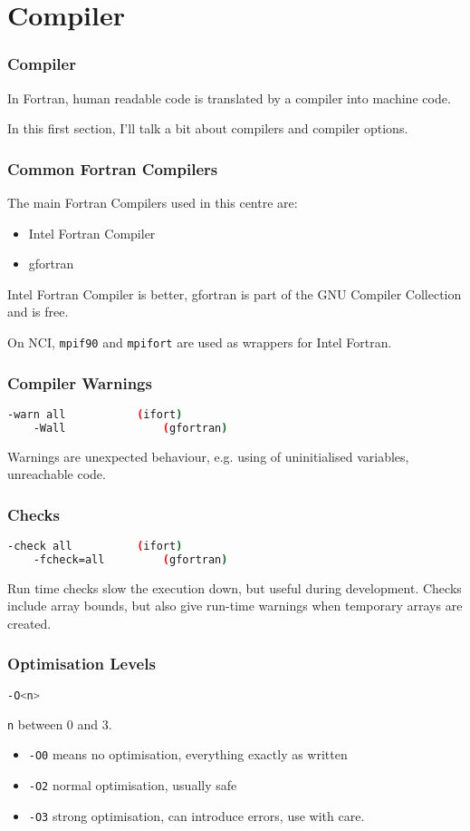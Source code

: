 \section{Compiler}
\begin{frame}
    \frametitle{Compiler}
    In Fortran, human readable code is translated
    by a compiler into machine code.

    In this first section, I'll talk a bit about compilers and compiler options.
\end{frame}

\begin{frame}
    \frametitle{Common Fortran Compilers}
    The main Fortran Compilers used in this centre are:
    \begin{itemize}
        \item Intel Fortran Compiler
        \item gfortran
    \end{itemize}
    Intel Fortran Compiler is better, gfortran is part of the GNU Compiler Collection and is free.

    On NCI, \texttt{mpif90} and \texttt{mpifort} are used as wrappers for Intel Fortran. 
\end{frame}
\begin{frame}[fragile]
    \frametitle{Compiler Warnings}
    \begin{lstlisting}[language=bash]
    -warn all           (ifort)
    -Wall               (gfortran)
    \end{lstlisting}
    Warnings are unexpected behaviour, e.g. using of uninitialised variables, unreachable code.
\end{frame}
\begin{frame}[fragile]
    \frametitle{Checks}
    \begin{lstlisting}[language=bash]
    -check all          (ifort)    
    -fcheck=all         (gfortran)
    \end{lstlisting}
    Run time checks slow the execution down, but useful during development.
    Checks include array bounds, but also give run-time warnings when temporary arrays are created.
\end{frame}
\begin{frame}[fragile]
    \frametitle{Optimisation Levels}
    \begin{lstlisting}[language=bash]
    -O<n>
    \end{lstlisting}
    \texttt{n} between 0 and 3.
    \begin{itemize}
    \item \texttt{-O0} means no optimisation, everything exactly as written
    \item \texttt{-O2} normal optimisation, usually safe
    \item \texttt{-O3} strong optimisation, can introduce errors, use with care.
    \end{itemize}
\end{frame}
